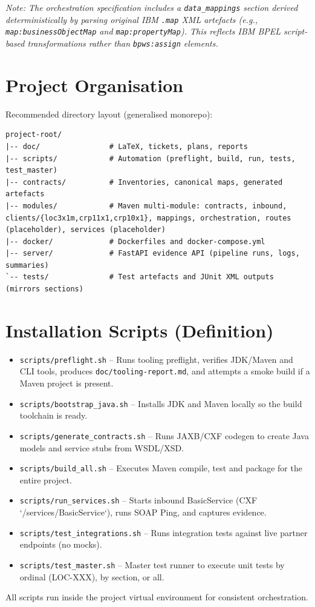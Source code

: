 \documentclass[11pt,a4paper]{article}
\begin{document}
\textit{Note: The orchestration specification includes a \texttt{data\_mappings} section derived deterministically by parsing original IBM \texttt{.map} XML artefacts (e.g., \texttt{map:businessObjectMap} and \texttt{map:propertyMap}). This reflects IBM BPEL script-based transformations rather than \texttt{bpws:assign} elements.}

\section{Project Organisation}
Recommended directory layout (generalised monorepo):

\begin{verbatim}
project-root/
|-- doc/                # LaTeX, tickets, plans, reports
|-- scripts/            # Automation (preflight, build, run, tests, test_master)
|-- contracts/          # Inventories, canonical maps, generated artefacts
|-- modules/            # Maven multi-module: contracts, inbound, clients/{loc3x1m,crp11x1,crp10x1}, mappings, orchestration, routes (placeholder), services (placeholder)
|-- docker/             # Dockerfiles and docker-compose.yml
|-- server/             # FastAPI evidence API (pipeline runs, logs, summaries)
`-- tests/              # Test artefacts and JUnit XML outputs (mirrors sections)
\end{verbatim}

\section{Installation Scripts (Definition)}
\begin{itemize}
  \item \texttt{scripts/preflight.sh} – Runs tooling preflight, verifies JDK/Maven and CLI tools, produces \texttt{doc/tooling-report.md}, and attempts a smoke build if a Maven project is present.
  \item \texttt{scripts/bootstrap\_java.sh} – Installs JDK and Maven locally so the build toolchain is ready.
  \item \texttt{scripts/generate\_contracts.sh} – Runs JAXB/CXF codegen to create Java models and service stubs from WSDL/XSD.
  \item \texttt{scripts/build\_all.sh} – Executes Maven compile, test and package for the entire project.
  \item \texttt{scripts/run\_services.sh} – Starts inbound BasicService (CXF `/services/BasicService`), runs SOAP Ping, and captures evidence.
  \item \texttt{scripts/test\_integrations.sh} – Runs integration tests against live partner endpoints (no mocks).
  \item \texttt{scripts/test\_master.sh} – Master test runner to execute unit tests by ordinal (LOC-XXX), by section, or all.
\end{itemize}
All scripts run inside the project virtual environment for consistent orchestration.
\end{document}
